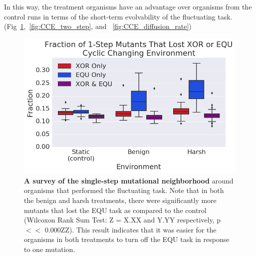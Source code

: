 \documentclass[10pt,letterpaper]{article}
\begin{document}
In this way, the treatment organisms
have an advantage over organisms from the control runs in terms of the short-term evolvability of the fluctuating task. (Fig~\ref{fig:CCE_single_step},~\ref{fig:CCE_two_step}, and ~\ref{fig:CCE_diffusion_rate})
\begin{figure}[!h] %
\includegraphics[trim={0.2cm 0 0 0.2cm},clip,width=1\columnwidth]{figures/CCE_frac_1step__box.png}
\caption{{\bf A survey of the single-step mutational neighborhood} around organisms that performed the fluctuating task. Note that in both the benign and harsh treatments, there were significantly more mutants that lost the EQU task as compared to the control (Wilcoxon Rank Sum Test: Z = X.XX and Y.YY respectively, p $<<$ 0.000ZZ). This result indicates that it was easier for the organisms in both treatments to turn off the EQU task in response to one mutation. %
}\label{fig:CCE_single_step}

\end{figure}
\end{document}
